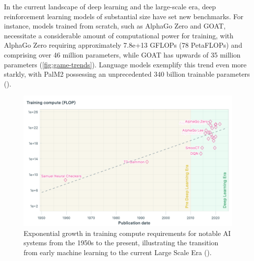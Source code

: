 \bigskip

\noindent In the current landscape of deep learning and the large-scale era, deep reinforcement learning models of substantial size have set new benchmarks. For instance, models trained from scratch, such as AlphaGo Zero and GOAT, necessitate a considerable amount of computational power for training, with AlphaGo Zero requiring approximately 7.8e+13 GFLOPs (78 PetaFLOPs) and comprising over 46 million parameters, while GOAT has upwards of 35 million parameters (\textcolor{deepblue}{\autoref{fig:game-trends}}). Language models exemplify this trend even more starkly, with PalM2 possessing an unprecedented 340 billion trainable parameters (\textcolor{deepblue}{\cite{Sevilla_2022}}). 

\bigskip

\begin{figure}[htbp]
    \centering
    \includegraphics[width=1\linewidth]{images/intro/related_works/game-trends.png}
    \captionsetup{justification=justified, singlelinecheck=false, width=1\linewidth, labelfont=bf}     
    \caption{Exponential growth in training compute requirements for notable AI systems from the 1950s to the present, illustrating the transition from early machine learning to the current Large Scale Era (\textcolor{deepblue}{\cite{epoch2023pcdtrends}}).}
    \label{fig:game-trends}
\end{figure}

